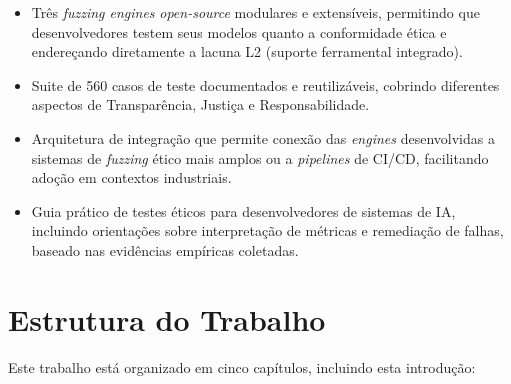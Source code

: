\begin{itemize}
    \item Três \textit{fuzzing engines} \textit{open-source} modulares e extensíveis, permitindo que desenvolvedores testem seus modelos quanto a conformidade ética e endereçando diretamente a lacuna L2 (suporte ferramental integrado).
    
    \item Suite de 560 casos de teste documentados e reutilizáveis, cobrindo diferentes aspectos de Transparência, Justiça e Responsabilidade.
    
    \item Arquitetura de integração que permite conexão das \textit{engines} desenvolvidas a sistemas de \textit{fuzzing} ético mais amplos ou a \textit{pipelines} de CI/CD, facilitando adoção em contextos industriais.
    
    \item Guia prático de testes éticos para desenvolvedores de sistemas de IA, incluindo orientações sobre interpretação de métricas e remediação de falhas, baseado nas evidências empíricas coletadas.
\end{itemize}

\section{Estrutura do Trabalho}

Este trabalho está organizado em cinco capítulos, incluindo esta introdução:

